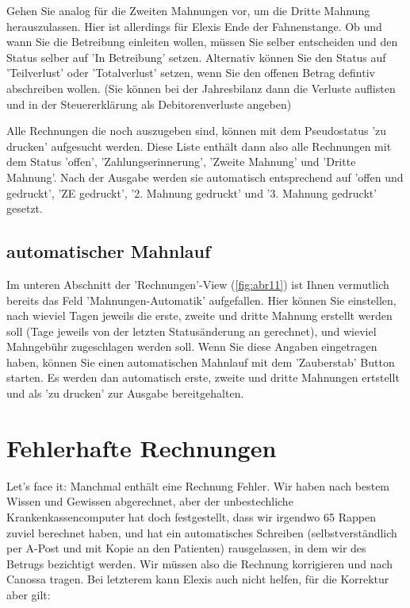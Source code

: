 \documentclass[a4paper]{scrartcl}
\begin{document}
\medskip 
{}
Gehen Sie analog für die Zweiten Mahnungen vor, um die Dritte Mahnung herauszulassen. Hier ist allerdings für Elexis Ende der Fahnenstange. Ob und wann Sie die Betreibung einleiten wollen, müssen Sie selber entscheiden und den Status selber auf 'In Betreibung' setzen. Alternativ können Sie den Status auf 'Teilverlust' oder 'Totalverlust' setzen, wenn Sie den offenen Betrag defintiv abschreiben wollen. (Sie können bei der Jahresbilanz dann die Verluste auflisten und in der Steuererklärung als Debitorenverluste angeben)

\medskip

Alle Rechnungen die noch auszugeben sind, können mit dem Pseudostatus 'zu drucken' aufgesucht werden. Diese Liste enthält dann also alle Rechnungen mit dem Status 'offen', 'Zahlungserinnerung', 'Zweite Mahnung' und 'Dritte Mahnung'. Nach der Ausgabe werden sie automatisch entsprechend auf 'offen und gedruckt', 'ZE gedruckt', '2. Mahnung gedruckt' und '3. Mahnung gedruckt' gesetzt.


\subsection{automatischer Mahnlauf}
Im unteren Abschnitt der 'Rechnungen'-View (\ref{fig:abr11}) ist Ihnen vermutlich bereits das Feld 'Mahnungen-Automatik' aufgefallen. Hier können Sie einstellen, nach wieviel Tagen jeweils die erste, zweite und dritte Mahnung erstellt werden soll (Tage jeweils von der letzten Statusänderung an gerechnet), und wieviel Mahngebühr zugeschlagen werden soll. Wenn Sie diese Angaben eingetragen haben, können Sie einen automatischen Mahnlauf mit dem 'Zauberstab' Button starten. Es werden dan automatisch erste, zweite und dritte Mahnungen ertstellt und als 'zu drucken' zur Ausgabe bereitgehalten.

\section{Fehlerhafte Rechnungen}
Let's face it: Manchmal enthält eine Rechnung Fehler. Wir haben nach bestem Wissen und Gewissen abgerechnet, aber der unbestechliche Krankenkassencomputer hat doch festgestellt, dass wir irgendwo 65 Rappen zuviel berechnet haben, und hat ein automatisches Schreiben (selbstverständlich per A-Post und mit Kopie an den Patienten) rausgelassen, in dem wir des Betrugs bezichtigt werden. Wir müssen also die Rechnung korrigieren und nach Canossa tragen. Bei letzterem kann Elexis auch nicht helfen, für die Korrektur aber gilt:
\end{document}
